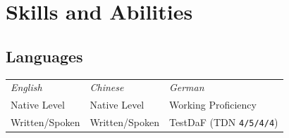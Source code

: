 \documentclass[11pt]{article}
\begin{document}
\vspace{-1em}

\section{\textcolor{section_4}{Skills and Abilities}}
\vspace{-\parskip}
	\subsection*{Languages}
		\begin{center}
			\begin{tabular}{@{} p{4cm} p{4cm} p{4.1cm} @{}}
				\textcolor{subheader}{\textit{English}} & \textcolor{subheader}{\textit{Chinese}} & \textcolor{subheader}{\textit{German}} \\
				Native Level & Native Level & Working Proficiency \\ 
				\textcolor{subtitles}{Written/Spoken} & \textcolor{subtitles}{Written/Spoken} & TestDaF (TDN \texttt{4/5/4/4})
			\end{tabular}
		\end{center}
	\vspace{-\parskip}
\end{document}
